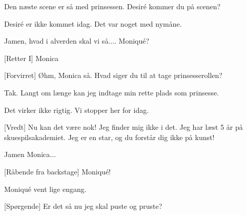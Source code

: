 \documentclass[a4paper,11pt]{article}
\begin{document}
\begin{sketch}
 Den næste scene er så med prinsessen. Desiré kommer du på scenen?


 Desiré er ikke kommet idag. Det var noget med nymåne.

 Jamen, hvad i alverden skal vi så....  Moniqué?

[Retter I] Monica 

[Forvirret] Øhm, Monica så.  Hvad siger du til at tage prinsesserollen?

 Tak. Langt om længe kan jeg indtage min rette plads som prinsesse. 

 Det virker ikke rigtig. Vi stopper her for idag. 

[Vredt] Nu kan det være nok! Jeg finder mig ikke i det. Jeg har læst 5 år på skuespilsakademiet. Jeg er en star, og du forstår dig ikke på kunst! 
 
 Jamen Monica...

[Råbende fra backstage] Moniqué!

 Moniqué vent lige engang. 


[Spørgende] Er det så nu jeg skal puste og pruste?

\end{sketch}
\end{document}
